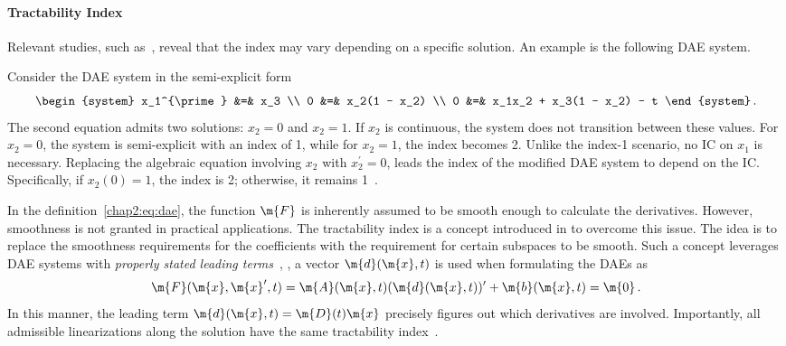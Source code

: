 \paragraph{Tractability Index}

Relevant studies, such as~\cite{lamour2013differential}, reveal that the index may vary depending on a specific solution. An example is the following \ac{DAE} system.

\begin{example}
  Consider the \ac{DAE} system in the semi-explicit form
  \begin{equation*}
    \begin{system}
    x_1^{\prime} &=& x_3 \\
    0            &=& x_2(1 - x_2) \\
    0            &=& x_1x_2 + x_3(1 - x_2) - t
    \end{system} \, \text{.}
  \end{equation*}
  The second equation admits two solutions: $x_2 = 0$ and $x_2 = 1$. If $x_2$ is continuous, the system does not transition between these values. For $x_2 = 0$, the system is semi-explicit with an index of 1, while for $x_2 = 1$, the index becomes 2. Unlike the index-1 scenario, no \ac{IC} on $x_1$ is necessary. Replacing the algebraic equation involving $x_2$ with $x_2^{\prime} = 0$, leads the index of the modified \ac{DAE} system to depend on the \ac{IC}. Specifically, if $x_2(0) = 1$, the index is 2; otherwise, it remains 1~\cite[Section 3.3]{lamour2013differential}.
\end{example}

In the definition~\eqref{chap2:eq:dae}, the function $\m{F}$ is inherently assumed to be smooth enough to calculate the derivatives. However, smoothness is not granted in practical applications. The tractability index is a concept introduced in \citet{griepentrog1986differential, marz2002index} to overcome this issue. The idea is to replace the smoothness requirements for the coefficients with the requirement for certain subspaces to be smooth. Such a concept leverages \ac{DAE} systems with \emph{properly stated leading terms}~\cite{lamour2013differential}, \ie{}, a vector $\m{d}(\m{x}, t)$ is used when formulating the \acp{DAE} as
%
\begin{equation*}
  \m{F}(\m{x}, \m{x}^{\prime}, t) = \m{A}(\m{x}, t) (\m{d}(\m{x}, t))^{\prime} + \m{b}(\m{x}, t) = \m{0} \, \text{.}
\end{equation*}
%
In this manner, the leading term $\m{d}(\m{x}, t) = \m{D}(t)\m{x}$ precisely figures out which derivatives are involved. Importantly, all admissible linearizations along the solution have the same tractability index~\cite{marz2005characterizing}.

